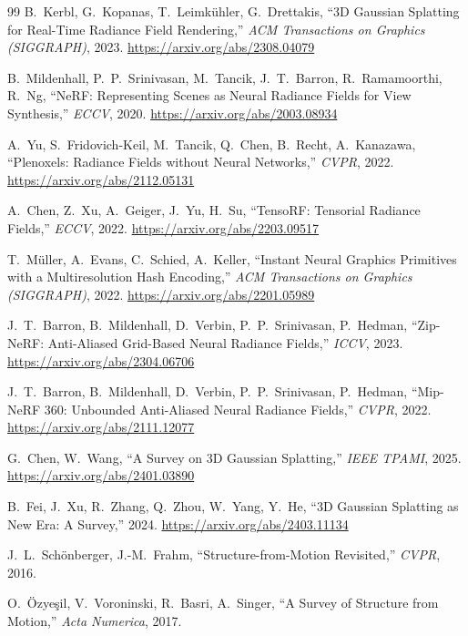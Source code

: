 \newpage
\begin{thebibliography}{99}
 B.~Kerbl, G.~Kopanas, T.~Leimkühler, G.~Drettakis,
``3D Gaussian Splatting for Real-Time Radiance Field Rendering,'' \textit{ACM
Transactions on Graphics (SIGGRAPH)}, 2023. \url{https://arxiv.org/abs/2308.04079}

 B.~Mildenhall, P.~P.~Srinivasan, M.~Tancik, J.~T.~Barron, R.~Ramamoorthi,
R.~Ng, ``NeRF: Representing Scenes as Neural Radiance Fields for View Synthesis,''
\textit{ECCV}, 2020. \url{https://arxiv.org/abs/2003.08934}

 A.~Yu, S.~Fridovich-Keil, M.~Tancik, Q.~Chen, B.~Recht,
A.~Kanazawa, ``Plenoxels: Radiance Fields without Neural Networks,'' \textit{CVPR},
2022. \url{https://arxiv.org/abs/2112.05131}

 A.~Chen, Z.~Xu, A.~Geiger, J.~Yu, H.~Su, ``TensoRF: Tensorial
Radiance Fields,'' \textit{ECCV}, 2022. \url{https://arxiv.org/abs/2203.09517}

 T.~Müller, A.~Evans, C.~Schied, A.~Keller, ``Instant Neural
Graphics Primitives with a Multiresolution Hash Encoding,'' \textit{ACM Transactions
on Graphics (SIGGRAPH)}, 2022. \url{https://arxiv.org/abs/2201.05989}

 J.~T.~Barron, B.~Mildenhall, D.~Verbin, P.~P.~Srinivasan,
P.~Hedman, ``Zip-NeRF: Anti-Aliased Grid-Based Neural Radiance Fields,''
\textit{ICCV}, 2023. \url{https://arxiv.org/abs/2304.06706}

 J.~T.~Barron, B.~Mildenhall, D.~Verbin, P.~P.~Srinivasan,
P.~Hedman, ``Mip-NeRF 360: Unbounded Anti-Aliased Neural Radiance Fields,''
\textit{CVPR}, 2022. \url{https://arxiv.org/abs/2111.12077}

 G.~Chen, W.~Wang, ``A Survey on 3D Gaussian Splatting,''
\textit{IEEE TPAMI}, 2025. \url{https://arxiv.org/abs/2401.03890}

 B.~Fei, J.~Xu, R.~Zhang, Q.~Zhou, W.~Yang, Y.~He, ``3D Gaussian
Splatting as New Era: A Survey,'' 2024. \url{https://arxiv.org/abs/2403.11134}

 J.~L.~Schönberger, J.-M.~Frahm, ``Structure-from-Motion
Revisited,'' \textit{CVPR}, 2016.

 O.~Özyeşil, V.~Voroninski, R.~Basri, A.~Singer, ``A Survey of
Structure from Motion,'' \textit{Acta Numerica}, 2017.


\end{thebibliography}
